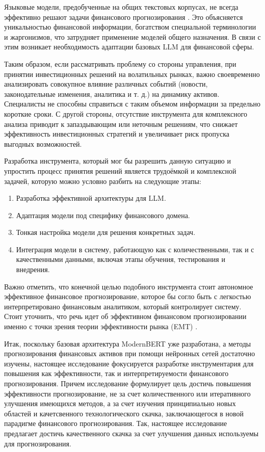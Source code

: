 Языковые модели, предобученные на общих текстовых корпусах, не всегда эффективно решают задачи финансового прогнозирования
\parencite{Jiang2023}. Это объясняется уникальностью финансовой информации, богатством специальной терминологии
и жаргонизмов, что затрудняет применение моделей общего назначения. В связи с этим возникает необходимость адаптации
базовых LLM для финансовой сферы.

Таким образом, если рассматривать проблему со стороны управления, при принятии инвестиционных решений на волатильных рынках,
важно своевременно анализировать совокупное влияние различных событий (новости, законодательные изменения, аналитика и т. д.)
на динамику активов. Специалисты не способны справиться с таким объемом информации за предельно короткие сроки. С другой
стороны, отсутствие инструмента для комплексного анализа приводит к запаздывающим или неточным решениям, что снижает
эффективность инвестиционных стратегий и увеличивает риск пропуска выгодных возможностей.

Разработка инструмента, который мог бы разрешить данную ситуацию и упростить процесс принятия решений является трудоёмкой
и комплексной задачей, которую можно условно разбить на следующие этапы:

\begin{enumerate}
    \item Разработка эффективной архитектуры для LLM.
    \item Адаптация модели под специфику финансового домена.
    \item Тонкая настройка модели для решения конкретных задач.
    \item Интеграция модели в систему, работающую как с количественными, так и с качественными данными,
    включая этапы обучения, тестирования и внедрения.
\end{enumerate}

Важно отметить, что конечной целью подобного инструмента стоит автономное эффективное финансовое прогнозирование, которое
бы согло быть с легкостью интерпретировано финансовым аналитиком, который контролирует систему. Стоит уточнить, что речь
идет об эффективном финансовом прогнозировании именно с точки зрения теории эффективности рынка (EMT) \parencite{emt1970fama}.

Итак, поскольку базовая архитектура ModernBERT уже разработана, а методы прогнозирования финансовых активов при помощи нейронных
сетей достаточно изучены, настоящее исследование фокусируется разработке инструментария для повышения как эффективности, так и
интерпретируемости финансового прогнозирования. Причем исследование формулирует цель достичь повышения эффективности прогнозирование,
не за счет количественного или итеративного улучшения имеющихся методов, а за счет изучения принципиально новых областей и качетсвенного
технологического скачка, заключающегося в новой парадигме финансового прогнозирования. Так, настоящее исследование предлагает
достичь качественного скачка за счет улучшения данных используемы для прогнозирования.

